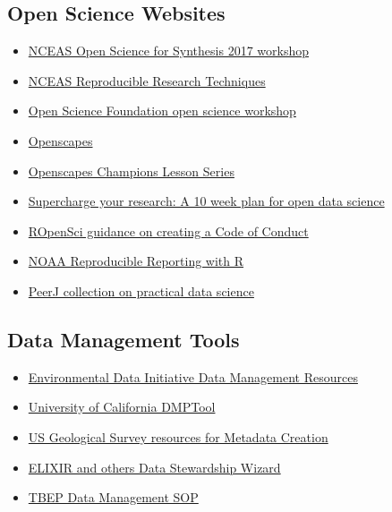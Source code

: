 \documentclass[
  letterpaper,
  DIV=11,
  numbers=noendperiod]{scrreprt}
\providecommand{\tightlist}{%
  \setlength{\itemsep}{0pt}\setlength{\parskip}{0pt}}\usepackage{longtable,booktabs,array}
\begin{document}
\hypertarget{open-science-websites}{%
\subsection*{Open Science Websites}\label{open-science-websites}}

\begin{itemize}
\tightlist
\item
  \href{https://nceas.github.io/oss-2017/lessons.html}{NCEAS Open
  Science for Synthesis 2017 workshop}
\item
  \href{https://learning.nceas.ucsb.edu/2020-02-RRCourse/}{NCEAS
  Reproducible Research Techniques}
\item
  \href{https://osf.io/k75r9/}{Open Science Foundation open science
  workshop}
\item
  \href{https://www.openscapes.org/}{Openscapes}
\item
  \href{https://openscapes.github.io/series/}{Openscapes Champions
  Lesson Series}
\item
  \href{https://www.nature.com/articles/d41586-019-03335-4}{Supercharge
  your research: A 10 week plan for open data science}
\item
  \href{https://ropensci.org/blog/2016/12/21/commcallv12-review-coc/}{ROpenSci
  guidance on creating a Code of Conduct}
\item
  \href{https://noaa-iea.github.io/r3-train/index.html}{NOAA
  Reproducible Reporting with R}
\item
  \href{https://peerj.com/collections/50-practicaldatascistats}{PeerJ
  collection on practical data science}
\end{itemize}

\hypertarget{data-management-tools}{%
\subsection*{Data Management Tools}\label{data-management-tools}}

\begin{itemize}
\tightlist
\item
  \href{https://environmentaldatainitiative.org/dm-resources/}{Environmental
  Data Initiative Data Management Resources}
\item
  \href{https://dmptool.org/}{University of California DMPTool}
\item
  \href{https://www.usgs.gov/products/data-and-tools/data-management/metadata-creation}{US
  Geological Survey resources for Metadata Creation}
\item
  \href{https://ds-wizard.org/}{ELIXIR and others Data Stewardship
  Wizard}
\item
  \href{https://tbep-tech.github.io/data-management-sop}{TBEP Data
  Management SOP}
\end{itemize}
\end{document}
